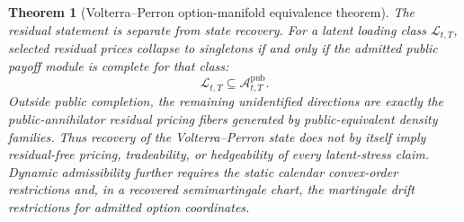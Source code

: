 \documentclass[11pt,a4paper]{amsart}
\theoremstyle{plain}
\newtheorem{theorem}{Theorem}[section]
\theoremstyle{definition}
\theoremstyle{remark}
\newcommand{\cA}{\mathcal{A}}
\newcommand{\cL}{\mathcal{L}}
\begin{document}
\begin{theorem}[Volterra--Perron option-manifold equivalence theorem]
The residual statement is separate from state recovery.  For a latent loading class
\(\cL_{t,T}\), selected residual prices collapse to singletons if and only if the admitted public
payoff module is complete for that class:
\[
        \cL_{t,T}\subseteq \cA_{t,T}^{\mathrm{pub}} .
\]
Outside public completion, the remaining unidentified directions are exactly the
public-annihilator residual pricing fibers generated by public-equivalent density families.  Thus
recovery of the Volterra--Perron state does not by itself imply residual-free pricing,
tradeability, or hedgeability of every latent-stress claim.  Dynamic admissibility further requires
the static calendar convex-order restrictions and, in a recovered semimartingale chart, the
martingale drift restrictions for admitted option coordinates.
\end{theorem}
\end{document}
